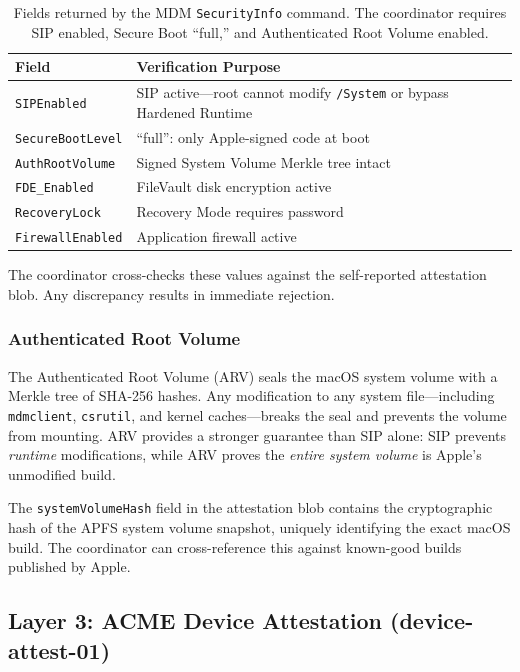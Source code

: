 \documentclass[10pt,twocolumn,letterpaper]{article}
\begin{document}
\begin{table}[h]
\centering
\caption{Fields returned by the MDM \texttt{SecurityInfo} command. The coordinator requires SIP enabled, Secure Boot ``full,'' and Authenticated Root Volume enabled.}
\vspace{4pt}
\small
\begin{tabular}{@{}lp{4.2cm}@{}}
\toprule
\textbf{Field} & \textbf{Verification Purpose} \\
\midrule
\texttt{SIPEnabled} & SIP active---root cannot modify \texttt{/System} or bypass Hardened Runtime \\
\texttt{SecureBootLevel} & ``full'': only Apple-signed code at boot \\
\texttt{AuthRootVolume} & Signed System Volume Merkle tree intact \\
\texttt{FDE\_Enabled} & FileVault disk encryption active \\
\texttt{RecoveryLock} & Recovery Mode requires password \\
\texttt{FirewallEnabled} & Application firewall active \\
\bottomrule
\end{tabular}
\end{table}

The coordinator cross-checks these values against the self-reported attestation blob. Any discrepancy results in immediate rejection.

\subsubsection{Authenticated Root Volume}
\label{sec:arv}

The Authenticated Root Volume (ARV) seals the macOS system volume with a Merkle tree of SHA-256 hashes. Any modification to any system file---including \texttt{mdmclient}, \texttt{csrutil}, and kernel caches---breaks the seal and prevents the volume from mounting. ARV provides a stronger guarantee than SIP alone: SIP prevents \emph{runtime} modifications, while ARV proves the \emph{entire system volume} is Apple's unmodified build.

The \texttt{systemVolumeHash} field in the attestation blob contains the cryptographic hash of the APFS system volume snapshot, uniquely identifying the exact macOS build. The coordinator can cross-reference this against known-good builds published by Apple.

\subsection{Layer 3: ACME Device Attestation (device-attest-01)}
\label{sec:mda}
\end{document}
